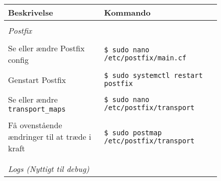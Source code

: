 \begin{figure}[H]
    \centering
    \begin{tabular}{l l}
        \textbf{Beskrivelse} & \textbf{Kommando} \\
        \hline
        & \\
        \textit{Postfix} & \\
        & \\
        \begin{minipage}
            {0.5\textwidth}
            Se eller ændre Postfix config
        \end{minipage}& 
        \begin{minipage}
            {0.5\textwidth}
            \texttt{\$ sudo nano /etc/postfix/main.cf}
        \end{minipage} \\
        & \\
        \begin{minipage}
            {0.5\textwidth}
            Genstart Postfix
        \end{minipage}& 
        \begin{minipage}
            {0.5\textwidth}
            \texttt{\$ sudo systemctl restart postfix}
        \end{minipage} \\
        & \\
        \begin{minipage}
            {0.5\textwidth}
            Se eller ændre \texttt{transport\_maps}
        \end{minipage}& 
        \begin{minipage}
            {0.5\textwidth}
            \texttt{\$ sudo nano /etc/postfix/transport}
        \end{minipage} \\
        & \\
        \begin{minipage}
            {0.5\textwidth}
            Få ovenstående ændringer til at træde i kraft
        \end{minipage}& 
        \begin{minipage}
            {0.5\textwidth}
            \texttt{\$ sudo postmap /etc/postfix/transport}
        \end{minipage} \\
        & \\
        \hline
        & \\
        \textit{Logs (Nyttigt til debug)} & \\

\end{tabular}
\end{figure}
